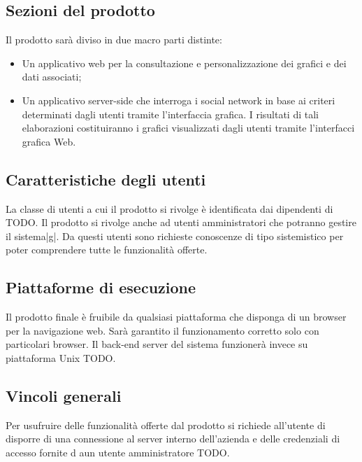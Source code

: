 \subsection{Sezioni del prodotto}
Il prodotto sarà diviso in due macro parti distinte:

\begin{itemize}
\item Un applicativo web per la consultazione e personalizzazione dei grafici e dei dati associati;
\item Un applicativo server-side che interroga i social network in base ai criteri determinati dagli utenti tramite l'interfaccia grafica. I risultati di tali elaborazioni costituiranno i grafici visualizzati dagli utenti tramite l'interfacci grafica Web.
\end{itemize}

\subsection{Caratteristiche degli utenti}
La classe di utenti a cui il prodotto si rivolge è identificata dai dipendenti di TODO. 
Il prodotto si rivolge anche ad utenti amministratori che potranno gestire il sistema|g|.
Da questi utenti sono richieste conoscenze di tipo sistemistico per poter comprendere tutte le funzionalità offerte.

\subsection{Piattaforme di esecuzione}
Il prodotto finale è fruibile da qualsiasi piattaforma che disponga di un browser per la navigazione web. Sarà garantito il funzionamento corretto solo con particolari browser.
Il back-end server del sistema funzionerà invece su piattaforma Unix TODO.

\subsection{Vincoli generali}
Per usufruire delle funzionalità offerte dal prodotto si richiede all’utente di disporre
di una connessione al server interno dell'azienda e delle credenziali di accesso fornite d aun utente amministratore TODO.
